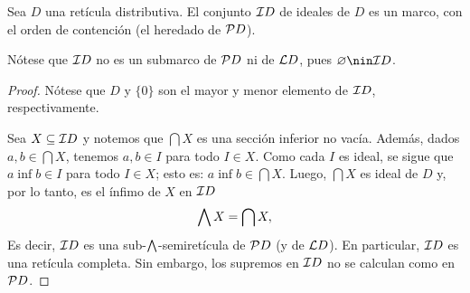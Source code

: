 \begin{lemma}
    Sea $D$ una retícula distributiva.
    El conjunto $\cal ID$ de ideales de $D$ es un marco,
    con el orden de contención (el heredado de $\cal PD$).
    
    Nótese que $\cal ID$ no es un submarco de $\cal PD$
    ni de $\cal LD$, pues $\emptyset\nin\cal ID$.
\end{lemma}
\begin{proof}
    Nótese que $D$ y $\{0\}$ son el mayor y menor elemento
    de $\cal ID$, respectivamente.
    
    Sea $X\subseteq\cal ID$ y notemos que $\bigcap X$
    es una sección inferior no vacía.
    Además, dados $a,b\in \bigcap X$, tenemos
    $a,b\in I$ para todo $I\in X$.
    Como cada $I$ es ideal, se sigue que
    $a\inf b\in I$ para todo $I\in X$; esto es:
    $a\inf b\in\bigcap X$.
    Luego, $\bigcap X$ es ideal de $D$ y, por lo tanto,
    es el ínfimo de $X$ en $\cal ID$
    \[
        \Inf X = \bigcap X,
    \]
    Es decir, $\cal ID$ es una sub-$\Inf$-semiretícula
    de $\cal PD$ (y de $\cal LD$).
    En particular, $\cal ID$ es una retícula completa.
    Sin embargo, los supremos en $\cal ID$ no se calculan
    como en $\cal PD$.
    

\end{proof}
